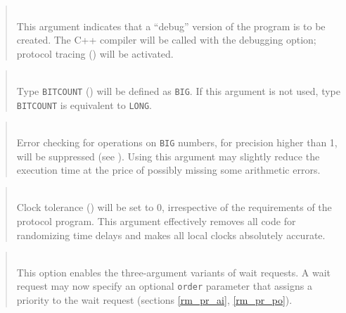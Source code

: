 \begin{quote}
\noindent{}\\ \hspace{0in}
This argument indicates that a ``debug'' version of the program is to be
created.
The C++ compiler will be called with the debugging option;
protocol tracing () will be activated.
\end{quote}

\begin{quote}
\noindent{}\\ \hspace{0in}
Type {\tt BITCOUNT} () will be defined as {\tt BIG}.
If this argument is not used, type {\tt BITCOUNT} is equivalent to {\tt LONG}.
\end{quote}

\begin{quote}
\noindent{}\\ \hspace{0in}
Error checking for operations on {\tt BIG} numbers, for
precision higher than 1, will be suppressed (see ).
Using this argument may slightly reduce the execution time at the price
of possibly missing some arithmetic errors.
\end{quote}

\begin{quote}
\noindent{}\\ \hspace{0in}
Clock tolerance ()
will be set to 0, irrespective of the requirements of the
protocol program.
This argument effectively removes all code for randomizing time delays and
makes all local clocks absolutely accurate.
\end{quote}

\begin{quote}
\noindent{}\\ \hspace{0in}
This option enables the three-argument variants of wait requests.
A wait request may now specify an optional {\tt order} parameter that
assigns a priority to the wait request (sections \ref{rm_pr_ai},
\ref{rm_pr_po}).
\end{quote}

